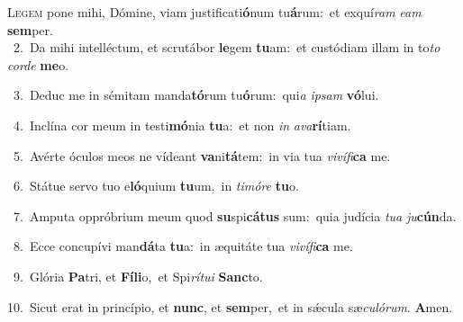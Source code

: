 \lettrine{\initial\textcolor{\initialcolor}{L}}{egem} pone mihi, Dómine, viam justificati\-\textbf{ó}\-num tu\-\textbf{á}\-rum:~\star et exquí\textit{ram} \textit{e}\-\textit{am} \textbf{sem}\-per.\\
{\numbfont\textcolor{\numbcolor}{~2.}}~Da mihi intelléctum, et scrutábor \textbf{le}\-gem \textbf{tu}\-am:~\star et custódiam illam in to\textit{to} \textit{cor}\-\textit{de} \textbf{me}\-o.\par
{\numbfont\textcolor{\numbcolor}{~3.}}~Deduc me in sémitam manda\-\textbf{tó}\-rum tu\-\textbf{ó}\-rum:~\star qui\textit{a} \textit{ip}\-\textit{sam} \textbf{vó}\-lui.\par
{\numbfont\textcolor{\numbcolor}{~4.}}~Inclína cor meum in testi\-\textbf{mó}\-nia \textbf{tu}\-a:~\star et non \textit{in} \textit{a}\-\textit{va}\textbf{rí}tiam.\par
{\numbfont\textcolor{\numbcolor}{~5.}}~Avérte óculos meos ne vídeant \textbf{va}\-ni\-\textbf{tá}\-tem:~\star in via tua \textit{vi}\-\textit{ví}\textit{fi}\textbf{ca} me.\par
{\numbfont\textcolor{\numbcolor}{~6.}}~Státue servo tuo e\-\textbf{ló}\-quium \textbf{tu}\-um,~\star in \textit{ti}\-\textit{mó}\textit{re} \textbf{tu}\-o.\par
{\numbfont\textcolor{\numbcolor}{~7.}}~Amputa oppróbrium meum quod \textbf{su}\-spi\-\textbf{cá}\-\textbf{tus} sum:~\star quia judícia \textit{tu}\-\textit{a} \textit{ju}\-\textbf{cún}da.\par
{\numbfont\textcolor{\numbcolor}{~8.}}~Ecce concupívi man\-\textbf{dá}\-ta \textbf{tu}\-a:~\star in æquitáte tua \textit{vi}\-\textit{ví}\textit{fi}\textbf{ca} me.\par
{\numbfont\textcolor{\numbcolor}{~9.}}~Glória \textbf{Pa}\-tri, et \textbf{Fí}\-\textbf{li}o,~\star et Spi\-\textit{rí}\-\textit{tu}\textit{i} \textbf{Sanc}\-to.\par
{\numbfont\textcolor{\numbcolor}{10.}}~Sicut erat in princípio, et \textbf{nunc}\-, et \textbf{sem}\-per,~\star et in sǽcula sæ\-\textit{cu}\-\textit{ló}\textit{rum}. \textbf{A}\-men.\par
